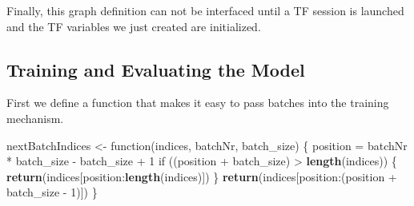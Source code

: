 \documentclass[]{article}
\newenvironment{Shaded}{\begin{snugshade}}{\end{snugshade}}
\newcommand{\KeywordTok}[1]{\textcolor[rgb]{0.13,0.29,0.53}{\textbf{{#1}}}}
\newcommand{\DataTypeTok}[1]{\textcolor[rgb]{0.13,0.29,0.53}{{#1}}}
\newcommand{\DecValTok}[1]{\textcolor[rgb]{0.00,0.00,0.81}{{#1}}}
\newcommand{\StringTok}[1]{\textcolor[rgb]{0.31,0.60,0.02}{{#1}}}
\newcommand{\NormalTok}[1]{{#1}}
\begin{document}
\begin{Shaded}
\end{Shaded}

Finally, this graph definition can not be interfaced until a TF session
is launched and the TF variables we just created are initialized.

\begin{Shaded}
\end{Shaded}

\subsection{Training and Evaluating the
Model}\label{training-and-evaluating-the-model}

First we define a function that makes it easy to pass batches into the
training mechanism.

\begin{Shaded}
\begin{Highlighting}[]
\NormalTok{nextBatchIndices <-}\StringTok{ }\NormalTok{function(indices, batchNr, batch_size) \{}
  \NormalTok{position =}\StringTok{ }\NormalTok{batchNr *}\StringTok{ }\NormalTok{batch_size -}\StringTok{ }\NormalTok{batch_size +}\StringTok{ }\DecValTok{1}
  \NormalTok{if ((position +}\StringTok{ }\NormalTok{batch_size) >}\StringTok{ }\KeywordTok{length}\NormalTok{(indices)) \{}
    \KeywordTok{return}\NormalTok{(indices[position:}\KeywordTok{length}\NormalTok{(indices)])}
  \NormalTok{\}}
  \KeywordTok{return}\NormalTok{(indices[position:(position +}\StringTok{ }\NormalTok{batch_size -}\StringTok{ }\DecValTok{1}\NormalTok{)])}
\NormalTok{\}}
\end{Highlighting}
\end{Shaded}
\end{document}
